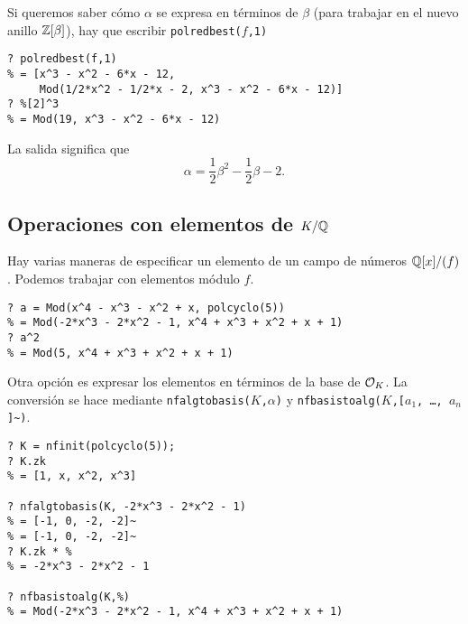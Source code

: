 Si queremos saber cómo $\alpha$ se expresa en términos de $\beta$ (para trabajar
en el nuevo anillo $\mathbb{Z} [\beta]$), hay que escribir \texttt{polredbest($f$,1)}

\begin{shaded}
\begin{verbatim}
? polredbest(f,1)
% = [x^3 - x^2 - 6*x - 12,
     Mod(1/2*x^2 - 1/2*x - 2, x^3 - x^2 - 6*x - 12)]
? %[2]^3
% = Mod(19, x^3 - x^2 - 6*x - 12)
\end{verbatim}
\end{shaded}

La salida significa que
$$\alpha = \frac{1}{2}\beta^2 - \frac{1}{2}\beta - 2.$$


\subsection{Operaciones con elementos de $K/\mathbb{Q}$}

Hay varias maneras de especificar un elemento de un campo de números
$\mathbb{Q}[x]/(f)$. Podemos trabajar con elementos módulo $f$.

\begin{shaded}
\begin{verbatim}
? a = Mod(x^4 - x^3 - x^2 + x, polcyclo(5))
% = Mod(-2*x^3 - 2*x^2 - 1, x^4 + x^3 + x^2 + x + 1)
? a^2
% = Mod(5, x^4 + x^3 + x^2 + x + 1)
\end{verbatim}
\end{shaded}

Otra opción es expresar los elementos en términos de la base de $\mathcal{O}_K$.
La conversión se hace mediante \texttt{nfalgtobasis($K$,$\alpha$)}
y \texttt{nfbasistoalg($K$,[$a_1$, \ldots, $a_n$]\textasciitilde)}.

\begin{shaded}
\begin{verbatim}
? K = nfinit(polcyclo(5));
? K.zk
% = [1, x, x^2, x^3]

? nfalgtobasis(K, -2*x^3 - 2*x^2 - 1)
% = [-1, 0, -2, -2]~
% = [-1, 0, -2, -2]~
? K.zk * %
% = -2*x^3 - 2*x^2 - 1

? nfbasistoalg(K,%)
% = Mod(-2*x^3 - 2*x^2 - 1, x^4 + x^3 + x^2 + x + 1)
\end{verbatim}
\end{shaded}

